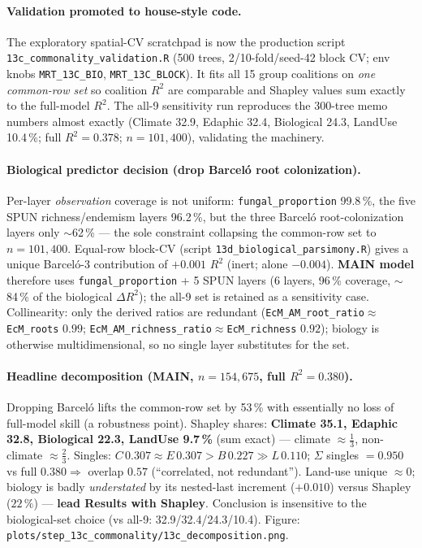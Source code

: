 \documentclass[11pt,a4paper]{article}
\begin{document}
\paragraph{Validation promoted to house-style code.} The exploratory spatial-CV
scratchpad is now the production script
\texttt{13c\_commonality\_validation.R} (500 trees, 2\textdegree{}/10-fold/seed-42
block CV; env knobs \texttt{MRT\_13C\_BIO}, \texttt{MRT\_13C\_BLOCK}). It fits all
15 group coalitions on \emph{one common-row set} so coalition $R^2$ are comparable
and Shapley values sum exactly to the full-model $R^2$. The all-9 sensitivity run
reproduces the 300-tree memo numbers almost exactly (Climate 32.9, Edaphic 32.4,
Biological 24.3, LandUse 10.4\,\%; full $R^2=0.378$; $n=101{,}400$), validating the
machinery.

\paragraph{Biological predictor decision (drop Barcel\'o root colonization).} Per-layer
\emph{observation} coverage is not uniform: \texttt{fungal\_proportion} 99.8\,\%,
the five SPUN richness/endemism layers 96.2\,\%, but the three Barcel\'o
root-colonization layers only $\sim$62\,\% --- the sole constraint collapsing the
common-row set to $n=101{,}400$. Equal-row block-CV (script
\texttt{13d\_biological\_parsimony.R}) gives a unique Barcel\'o-3 contribution of
$+0.001$ $R^2$ (inert; alone $-0.004$). \textbf{MAIN model} therefore uses
\texttt{fungal\_proportion} + 5 SPUN layers (6 layers, 96\,\% coverage, $\sim$84\,\%
of the biological $\Delta R^2$); the all-9 set is retained as a sensitivity case.
Collinearity: only the derived ratios are redundant
(\texttt{EcM\_AM\_root\_ratio}$\approx$\texttt{EcM\_roots} $0.99$;
\texttt{EcM\_AM\_richness\_ratio}$\approx$\texttt{EcM\_richness} $0.92$); biology is
otherwise multidimensional, so no single layer substitutes for the set.

\paragraph{Headline decomposition (MAIN, $n=154{,}675$, full $R^2=0.380$).} Dropping
Barcel\'o lifts the common-row set by 53\,\% with essentially no loss of full-model
skill (a robustness point). Shapley shares: \textbf{Climate 35.1, Edaphic 32.8,
Biological 22.3, LandUse 9.7\,\%} (sum exact) --- climate $\approx\!\tfrac13$,
non-climate $\approx\!\tfrac23$. Singles: $C\,0.307 \approx E\,0.307 > B\,0.227
\gg L\,0.110$; $\Sigma$ singles $=0.950$ vs full $0.380 \Rightarrow$ overlap $0.57$
(``correlated, not redundant''). Land-use unique $\approx 0$; biology is badly
\emph{understated} by its nested-last increment ($+0.010$) versus Shapley
($22\,\%$) --- \textbf{lead Results with Shapley}. Conclusion is insensitive to the
biological-set choice (vs all-9: 32.9/32.4/24.3/10.4). Figure:
\texttt{plots/step\_13c\_commonality/13c\_decomposition.png}.
\end{document}
